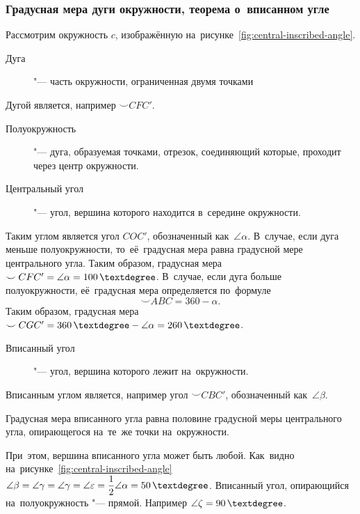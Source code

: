 \documentclass[]{scrartcl}
\begin{document}
\subsubsection{Градусная мера дуги окружности, теорема о~вписанном угле}
Рассмотрим окружность ${\textstyle c}$, изображённую на~рисунке~\ref{fig:central-inscribed-angle}.
\begin{description}
	\item[Дуга] "--- часть окружности, ограниченная двумя точками
\end{description}
Дугой является, например ${\textstyle \smile CFC'}$.
\begin{description}
	\item[Полуокружность] "--- дуга, образуемая точками, отрезок, соединяющий которые, проходит через центр окружности.
\end{description}
\begin{description}
	\item[Центральный угол] "--- угол, вершина которого находится в~середине окружности.
\end{description}
Таким углом является угол ${\textstyle COC'}$, обозначенный как~${\textstyle \angle \alpha}$. В~случае, если дуга меньше полуокружности, то~её~градусная мера равна градусной мере центрального угла. Таким образом, градусная мера ${\textstyle \smile CFC' = \angle \alpha = 100\,\textdegree}$. В~случае, если дуга больше полуокружности, её~градусная мера определяется по~формуле
\begin{equation}\label{eq:arc-1}
\smile ABC = 360 - \alpha.
\end{equation}
Таким образом, градусная мера ${\textstyle \smile CGC' = 360\,\textdegree - \angle \alpha = 260\,\textdegree}$.
\begin{description}
	\item[Вписанный угол] "--- угол, вершина которого лежит на~окружности.
\end{description}
Вписанным углом является, например угол ${\textstyle \smile CBC'}$, обозначенный как~${\textstyle \angle \beta}$.
\begin{theorem}
	Градусная мера вписанного угла равна половине градусной меры центрального угла, опирающегося на~те~же точки на~окружности.
\end{theorem}
При~этом, вершина вписанного угла может быть любой. Как~видно на~рисунке~\ref{fig:central-inscribed-angle} ${\textstyle \angle \beta = \angle \gamma = \angle \gamma = \angle \varepsilon = \dfrac{1}{2}\angle \alpha = 50\,\textdegree}$. Вписанный угол, опирающийся на~полуокружность "--- прямой. Например ${\textstyle \angle \zeta = 90\,\textdegree}$.
\end{document}
